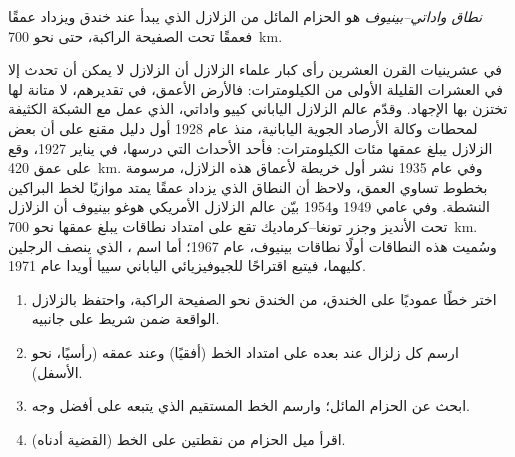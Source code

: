 \begin{definition}\label{def:g11:subduction-zones:benioff}
\emph{نطاق واداتي--بينيوف} هو الحزام
المائل من الزلازل الذي يبدأ عند خندق ويزداد عمقًا فعمقًا تحت
الصفيحة الراكبة، حتى نحو \qty{700}{km}.
\end{definition}

\begin{history}
في عشرينيات القرن العشرين رأى كبار علماء الزلازل أن الزلازل لا يمكن أن تحدث
إلا في العشرات القليلة الأولى من الكيلومترات: فالأرض الأعمق، في تقديرهم،
لا متانة لها تختزن بها الإجهاد. وقدّم عالم الزلازل الياباني كييو واداتي، الذي عمل مع
الشبكة الكثيفة لمحطات وكالة الأرصاد الجوية اليابانية، منذ عام 1928
أول دليل مقنع على أن بعض الزلازل يبلغ عمقها مئات
الكيلومترات: فأحد الأحداث التي درسها، في يناير 1927، وقع على عمق
\qty{420}{km}. وفي عام 1935 نشر أول خريطة لأعماق
هذه الزلازل، مرسومة بخطوط تساوي العمق، ولاحظ أن النطاق
الذي يزداد عمقًا يمتد موازيًا لخط البراكين النشطة. وفي عامي 1949 و1954 بيّن
عالم الزلازل الأمريكي هوغو بينيوف أن الزلازل تحت الأنديز وجزر
تونغا--كرماديك تقع على امتداد نطاقات يبلغ عمقها
نحو \qty{700}{km}. وسُميت هذه النطاقات أولًا نطاقات بينيوف، عام 1967؛ أما
اسم ، الذي ينصف الرجلين كليهما، فيتبع اقتراحًا
للجيوفيزيائي الياباني سييا أويدا عام 1971.
\end{history}

\begin{method}\label{met:g11:subduction-zones:section}
\begin{enumerate}
  \item اختر خطًا عموديًا على الخندق، من الخندق نحو
        الصفيحة الراكبة، واحتفظ بالزلازل الواقعة ضمن شريط على جانبيه.
  \item ارسم كل زلزال عند بعده على امتداد الخط (أفقيًا)
        وعند عمقه (رأسيًا، نحو الأسفل).
  \item ابحث عن الحزام المائل؛ وارسم الخط المستقيم الذي يتبعه
        على أفضل وجه.
  \item اقرأ ميل الحزام من نقطتين على الخط (القضية
        أدناه).
\end{enumerate}
\end{method}

